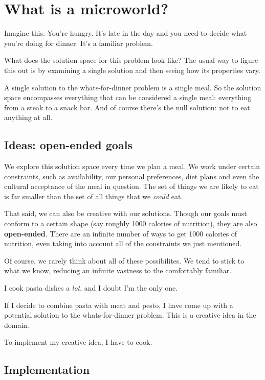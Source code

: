 \section{What is a microworld?}

Imagine this. You're hungry. It's late in the day and you need to
decide what you're doing for dinner. It's a familiar problem.

What does the solution space for this problem look like? The usual way to figure this out
is by examining a single solution and then seeing how its properties vary.

A single solution to the whats-for-dinner problem is a single meal. So
the solution space encompasses everything that can be considered a
single meal: everything from a steak to a snack bar. And of course
there's the null solution: not to eat anything at all.

\subsection{Ideas: open-ended goals}

We explore this solution space every time we plan a meal. We work under
certain constraints, such as availability, our personal preferences,
diet plans and even the cultural acceptance of the meal in question. The
set of things we are likely to eat is far smaller than the set of all
things that we \emph{could} eat.

That said, we can also be creative with our solutions. Though our goals
must conform to a certain shape (say roughly 1000 calories of
nutrition), they are also \textbf{open-ended}. There are an infinite
number of ways to get 1000 calories of nutrition, even taking into
account all of the constraints we just mentioned.

Of course, we rarely think about all of these possibilites. We tend to
stick to what we know, reducing an infinite vastness to the comfortably
familiar.

I cook pasta dishes a \emph{lot}, and I doubt I'm the only one.

If I decide to combine pasta with meat and pesto, I have come up with a
potential solution to the whats-for-dinner problem. This is a
creative idea in the domain.

To implement my creative idea, I have to cook.

\subsection{Implementation}


